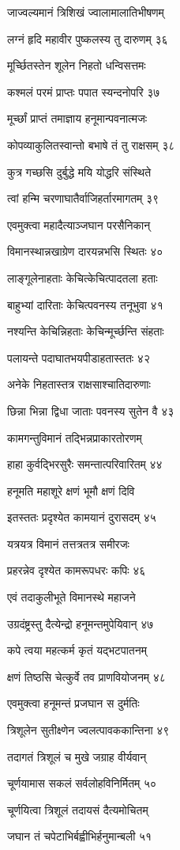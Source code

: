जाज्वल्यमानं त्रिशिखं ज्वालामालातिभीषणम्

लग्नं हृदि महावीर पुष्कलस्य तु दारुणम् ३६

मूर्च्छितस्तेन शूलेन निहतो धन्विसत्तमः

कश्मलं परमं प्राप्तः पपात स्यन्दनोपरि ३७

मूर्च्छां प्राप्तं तमाज्ञाय हनूमान्पवनात्मजः

कोपव्याकुलितस्वान्तो बभाषे तं तु राक्षसम् ३८

कुत्र गच्छसि दुर्बुद्धे मयि योद्धरि संस्थिते

त्वां हन्मि चरणाघातैर्वाजिहर्तारमागतम् ३९

एवमुक्त्वा महादैत्याञ्जघान परसैनिकान्

विमानस्थान्नखाग्रेण दारयन्नभसि स्थितः ४०

लाङ्गूलेनाहताः केचित्केचित्पादतला हताः

बाहुभ्यां दारिताः केचित्पवनस्य तनूभुवा ४१

नश्यन्ति केचिन्निहताः केचिन्मूर्च्छन्ति संहताः

पलायन्ते पदाघातभयपीडाहतास्ततः ४२

अनेके निहतास्तत्र राक्षसाश्चातिदारुणाः

छिन्ना भिन्ना द्विधा जाताः पवनस्य सुतेन वै ४३

कामगन्तुविमानं तद्भिन्नप्राकारतोरणम्

हाहा कुर्वद्भिरसुरैः समन्तात्परिवारितम् ४४

हनूमति महाशूरे क्षणं भूमौ क्षणं दिवि

इतस्ततः प्रदृश्येत कामयानं दुरासदम् ४५

यत्रयत्र विमानं तत्तत्रतत्र समीरजः

प्रहरन्नेव दृश्येत कामरूपधरः कपिः ४६

एवं तदाकुलीभूते विमानस्थे महाजने

उग्रदंष्ट्रस्तु दैत्येन्द्रो हनूमन्तमुपेयिवान् ४७

कपे त्वया महत्कर्म कृतं यद्भटपातनम्

क्षणं तिष्ठसि चेत्कुर्वे तव प्राणवियोजनम् ४८

एवमुक्त्वा हनूमन्तं प्रजघान स दुर्मतिः

त्रिशूलेन सुतीक्ष्णेन ज्वलत्पावककान्तिना ४९

तदागतं त्रिशूलं च मुखे जग्राह वीर्यवान्

चूर्णयामास सकलं सर्वलोहविनिर्मितम् ५०

चूर्णयित्वा त्रिशूलं तदायसं दैत्यमोचितम्

जघान तं चपेटाभिर्बह्वीभिर्हनुमान्बली ५१

